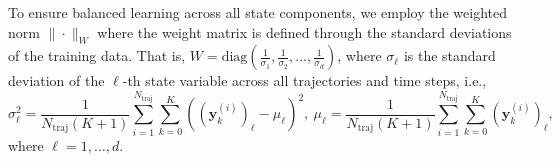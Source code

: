 \documentclass[final]{siamltex}
\newcommand{\bfa}[1]{\boldsymbol{#1}}
\begin{document}
To ensure balanced learning across all state components, we employ the weighted norm $\|\cdot\|_W$ where the weight matrix is defined through the standard deviations of the training data. That is, $W = \text{diag}(\frac{1}{\sigma_1}, \frac{1}{\sigma_2}, \ldots, \frac{1}{\sigma_d})$, where $\sigma_\ell$ is the standard deviation of the $\ell$-th state variable across all trajectories and time steps, i.e.,
\begin{equation*}
\label{eq:std_l}
\sigma_\ell^2 = \frac{1}{N_{\text{traj}}(K+1)} \sum_{i=1}^{N_{\text{traj}}} \sum_{k=0}^{K} \left((\bfa{y}_k^{(i)})_\ell - \mu_\ell\right)^2, \
\mu_\ell = \frac{1}{N_{\text{traj}}(K+1)} \sum_{i=1}^{N_{\text{traj}}} \sum_{k=0}^{K} (\bfa{y}_k^{(i)})_\ell,
\end{equation*}
where $\ell = 1, \ldots, d$.
\end{document}
